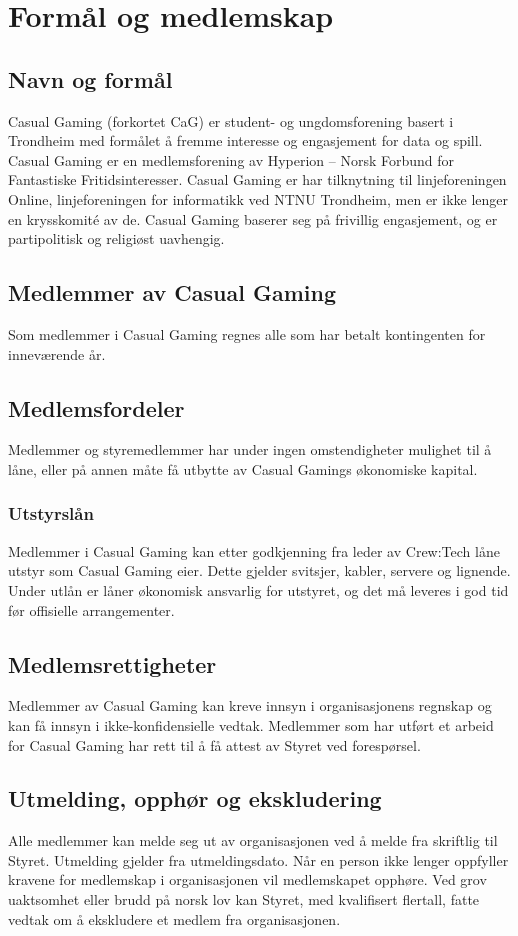 \chapter{Formål og medlemskap}

\section{Navn og formål}
Casual Gaming (forkortet CaG) er student- og ungdomsforening basert i Trondheim med formålet å fremme interesse og engasjement for data og spill. Casual Gaming er en medlemsforening av Hyperion – Norsk Forbund for Fantastiske Fritidsinteresser. Casual Gaming er har tilknytning til linjeforeningen Online, linjeforeningen for informatikk ved NTNU Trondheim, men er ikke lenger en krysskomité av de. Casual Gaming baserer seg på frivillig engasjement, og er partipolitisk og religiøst uavhengig.

\section{Medlemmer av Casual Gaming}
Som medlemmer i Casual Gaming regnes alle som har betalt kontingenten for inneværende år.

\section{Medlemsfordeler}
Medlemmer og styremedlemmer har under ingen omstendigheter mulighet til å låne, eller på annen måte få utbytte av Casual Gamings økonomiske kapital.

\subsection{Utstyrslån}
Medlemmer i Casual Gaming kan etter godkjenning fra leder av Crew:Tech låne utstyr som Casual Gaming eier. Dette gjelder svitsjer, kabler, servere og lignende. Under utlån er låner økonomisk ansvarlig for utstyret, og det må leveres i god tid før offisielle arrangementer.

\section{Medlemsrettigheter}
Medlemmer av Casual Gaming kan kreve innsyn i organisasjonens regnskap og kan få innsyn i ikke-konfidensielle vedtak. Medlemmer som har utført et arbeid for Casual Gaming har rett til å få attest av Styret ved forespørsel.

\section{Utmelding, opphør og ekskludering}
Alle medlemmer kan melde seg ut av organisasjonen ved å melde fra skriftlig til Styret. Utmelding gjelder fra utmeldingsdato. Når en person ikke lenger oppfyller kravene for medlemskap i organisasjonen vil medlemskapet opphøre. Ved grov uaktsomhet eller brudd på norsk lov kan Styret, med kvalifisert flertall, fatte vedtak om å ekskludere et medlem fra organisasjonen.
